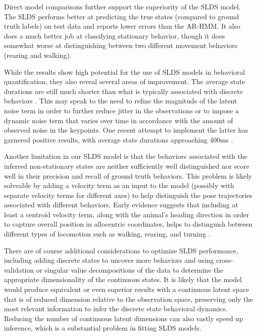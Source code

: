 Direct model comparisons further support the superiority of the SLDS model. The SLDS performs better at predicting the true states (compared to ground truth labels) on test data and reports lower errors than the AR-HMM. It also does a much better job at classifying stationary behavior, though it does somewhat worse at distinguishing between two different movement behaviors (rearing and walking). 

While the results show high potential for the use of SLDS models in behavioral quantification, they also reveal several areas of improvement. The average state durations are still much shorter than what is typically associated with discrete behaviors \cite{wiltschko_mapping_2015}. This may speak to the need to refine the magnitude of the latent noise term in order to further reduce jitter in the observations or to impose a dynamic noise term that varies over time in accordance with the amount of observed noise in the keypoints. One recent attempt to implement the latter has garnered positive results, with average state durations approaching 400ms \cite{weinreb_keypoint-moseq_2023}. 

Another limitation in our SLDS model is that the behaviors associated with the inferred non-stationary states are neither sufficiently well distinguished nor score well in their precision and recall of ground truth behaviors. This problem is likely solveable by adding a velocity term as an input to the model (possibly with separate velocity terms for different axes) to help distinguish the pose trajectories associated with different behaviors. Early evidence suggests that including at least a centroid velocity term, along with the animal's heading direction in order to capture overall position in allocentric coordinates, helps to distinguish between different types of locomotion such as walking, rearing, and turning \cite{weinreb_keypoint-moseq_2023}. 

There are of course additional considerations to optimize SLDS performance, including adding discrete states to uncover more behaviors and using cross-validation or singular value decompositions of the data to determine the appropriate dimensionality of the continuous states. It is likely that the model would produce equivalent or even superior results with a continuous latent space that is of reduced dimension relative to the observation space, preserving only the most relevant information to infer the discrete state behavioral dynamics. Reducing the number of continuous latent dimensions can also vastly speed up inference, which is a substantial problem in fitting SLDS models. 

